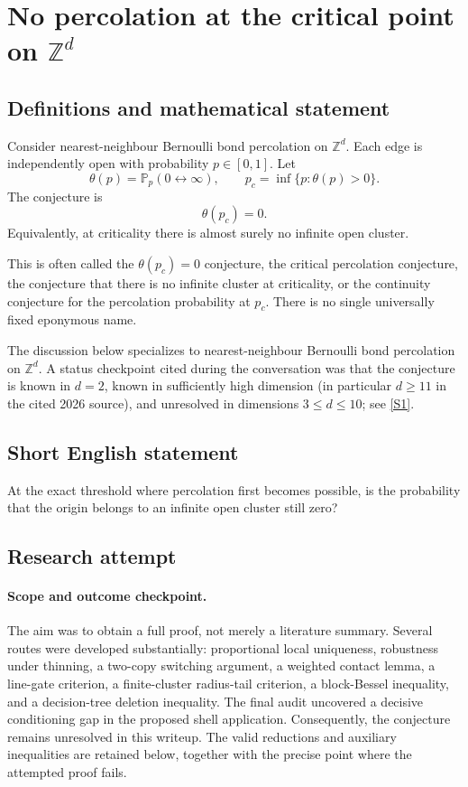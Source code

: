 \documentclass[11pt]{article}
\begin{document}
\section*{\texorpdfstring{No percolation at the critical point on $\mathbb{Z}^d$}{No percolation at the critical point on \$\textbackslash{}mathbb\{Z\}\textasciicircum{}d\$}}\label{critical-percolation}\label{10100001}

\subsection{Definitions and mathematical statement}
Consider nearest-neighbour Bernoulli bond percolation on \(\mathbb Z^d\). Each edge is independently open with probability \(p\in[0,1]\). Let
\[
\theta(p)=\mathbb P_p(0\leftrightarrow\infty),
\qquad
p_c=\inf\{p:\theta(p)>0\}.
\]
The conjecture is
\[
\boxed{\theta(p_c)=0.}
\]
Equivalently, at criticality there is almost surely no infinite open cluster.

This is often called the \(\theta(p_c)=0\) conjecture, the critical percolation conjecture, the conjecture that there is no infinite cluster at criticality, or the continuity conjecture for the percolation probability at \(p_c\). There is no single universally fixed eponymous name.

The discussion below specializes to nearest-neighbour Bernoulli bond percolation on \(\mathbb Z^d\). A status checkpoint cited during the conversation was that the conjecture is known in \(d=2\), known in sufficiently high dimension (in particular \(d\ge 11\) in the cited 2026 source), and unresolved in dimensions \(3\le d\le10\); see \href{https://arxiv.org/html/2608.23661v1}{[S1]}.

\subsection{Short English statement}
At the exact threshold where percolation first becomes possible, is the probability that the origin belongs to an infinite open cluster still zero?

\subsection{Research attempt}

\paragraph{Scope and outcome checkpoint.}
The aim was to obtain a full proof, not merely a literature summary. Several routes were developed substantially: proportional local uniqueness, robustness under thinning, a two-copy switching argument, a weighted contact lemma, a line-gate criterion, a finite-cluster radius-tail criterion, a block-Bessel inequality, and a decision-tree deletion inequality. The final audit uncovered a decisive conditioning gap in the proposed shell application. Consequently, the conjecture remains unresolved in this writeup. The valid reductions and auxiliary inequalities are retained below, together with the precise point where the attempted proof fails.
\end{document}
